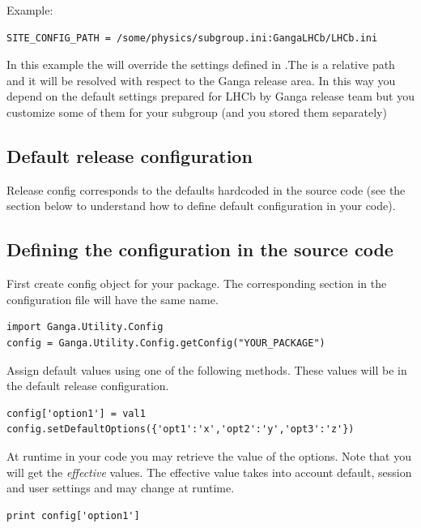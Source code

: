 \documentclass{howto}
\begin{document}
Example:
\begin{verbatim} 
SITE_CONFIG_PATH = /some/physics/subgroup.ini:GangaLHCb/LHCb.ini
\end{verbatim}

In  this  example  the    will  override  the
settings        defined        in        .The
 is  a relative path and it  will be resolved
with respect to the Ganga release  area. In this way you depend on the
default  settings prepared  for LHCb  by  Ganga release  team but  you
customize  some  of  them  for  your subgroup  (and  you  stored  them
separately)


\subsection{Default release configuration}

Release  config corresponds to  the defaults  hardcoded in  the source
code  (see the  section  below  to understand  how  to define  default
configuration in your code).


\subsection{Defining the configuration in the source code}

First create config object for your package. The corresponding section
in the configuration file will have the same name.

\begin{verbatim}
import Ganga.Utility.Config 
config = Ganga.Utility.Config.getConfig("YOUR_PACKAGE")
\end{verbatim}

Assign default values using one of the following methods. These values
will be in the default release configuration.

\begin{verbatim}
config['option1'] = val1
config.setDefaultOptions({'opt1':'x','opt2':'y','opt3':'z'})
\end{verbatim}

At  runtime  in   your  code  you  may  retrieve   the  value  of  the
options.  Note that  you will  get  the {\em  effective} values.   The
effective value takes into  account default, session and user settings
and may change at runtime.

\begin{verbatim}
print config['option1']
\end{verbatim}
\end{document}
